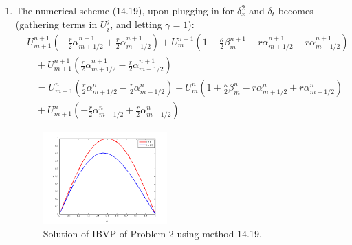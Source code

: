 \documentclass[11pt]{article}
\def\f{\frac }
\begin{document}
\begin{enumerate}
\item The numerical scheme (14.19), upon plugging in for $\delta _x ^2$ and $\delta _t$ becomes (gathering terms in $U_i ^j$, and letting $\gamma = 1$):
\begin{align*} &U_{m+1} ^{n+1} \left ( -\f{r}{2} \alpha _{m+1/2} ^{n+1} +\f{r}{2} \alpha _{m-1/2} ^{n+1} \right ) + U_{m} ^{n+1} \left ( 1 - \f{\kappa}{2} \beta _{m} ^{n+1} +r \alpha _{m+1/2} ^{n+1} -r \alpha _{m-1/2} ^{n+1} \right )\\
&~~~~ + U_{m+1} ^{n+1} \left ( \f{r}{2} \alpha _{m+1/2} ^{n+1} -\f{r}{2} \alpha _{m-1/2} ^{n+1} \right )\\
&~~~~ = U_{m+1} ^{n} \left ( \f{r}{2} \alpha _{m+1/2} ^{n} -\f{r}{2} \alpha _{m-1/2} ^{n} \right ) + U_{m} ^{n} \left ( 1 + \f{\kappa}{2} \beta _{m} ^{n} -r \alpha _{m+1/2} ^{n} +r \alpha _{m-1/2} ^{n} \right )\\
&~~~~ + U_{m+1} ^{n} \left ( - \f{r}{2} \alpha _{m+1/2} ^{n} +\f{r}{2} \alpha _{m-1/2} ^{n} \right )\end{align*}



\begin{figure}[h!]
  \centering
    \includegraphics[width=0.45\textwidth]{andy_hw14_prb02_01.png}
  \caption{Solution of IBVP of Problem 2 using method 14.19.}
\end{figure}


\end{enumerate}
\end{document}
